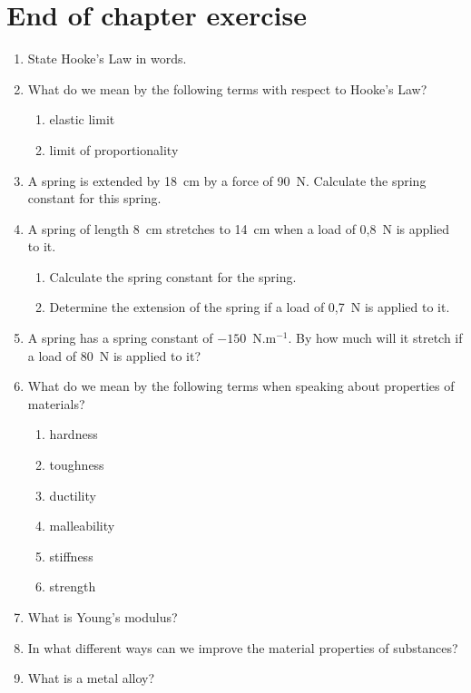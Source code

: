 \section{End of chapter exercise}
\begin{enumerate}

\item State Hooke's Law in words.

\item What do we mean by the following terms with respect to Hooke's Law?
\begin{enumerate}
\item elastic limit
\item limit of proportionality
\end{enumerate}

\item A spring is extended by 18~cm by a force of 90~N. Calculate the spring constant for this spring.

\item A spring of length 8~cm stretches to 14~cm when a load of 0,8~N is applied to it.
\begin{enumerate}
\item Calculate the spring constant for the spring.
\item Determine the extension of the spring if a load of 0,7~N is applied to it.
\end{enumerate}

\item A spring has a spring constant of $-150$~N.m$^{-1}$. By how much will it stretch if a load of 80~N is applied to it?

\item What do we mean by the following terms when speaking about properties of materials?
\begin{enumerate}
\item hardness
\item toughness
\item ductility
\item malleability
\item stiffness
\item strength
\end{enumerate}

\item What is Young's modulus?

\item In what different ways can we improve the material properties of substances?

\item What is a metal alloy?


\end{enumerate}
